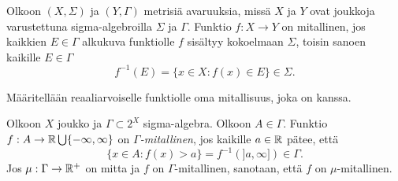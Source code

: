 \documentclass[12pt,oneside,a4paper]{amsbook} %
\begin{document}
\begin{definition}
    Olkoon $(X, \Sigma)$ ja $(Y, \Gamma)$ metrisiä avaruuksia, missä $X$ ja $Y$ ovat joukkoja varustettuna sigma-algebroilla $\Sigma$ ja $\Gamma$. Funktio $f: X \to Y$ on mitallinen, jos kaikkien $E\in \Gamma$ alkukuva funktiolle $f$ sisältyy kokoelmaan $\Sigma$, toisin sanoen kaikille $E \in \Gamma$
    \begin{equation*}
        f^{-1}(E) = \{x \in X : f(x) \in E\} \in \Sigma.  
    \end{equation*}
\end{definition}

Määritellään reaaliarvoiselle funktiolle oma mitallisuus, joka on  kanssa.

\begin{definition}
     Olkoon $X$ joukko ja $\Gamma \subset 2^X$ sigma-algebra. Olkoon $A\in \Gamma$. Funktio $f: A \to \mathbb{R} \bigcup\{-\infty, \infty\}$ on \textit{$\Gamma$-mitallinen}, jos kaikille $a \in \mathbb{R}$ pätee, että
    \begin{equation*}
        \{x \in A : f(x) > a\} = f^{-1}(]a, \infty]) \in \Gamma.
    \end{equation*} 
    Jos $\mu:\Gamma \to {\mathbb{R}^{+}}$ on mitta ja $f$ on $\Gamma$-mitallinen, sanotaan, että $f$ on $\mu$-mitallinen.
    
\end{definition}
\end{document}
